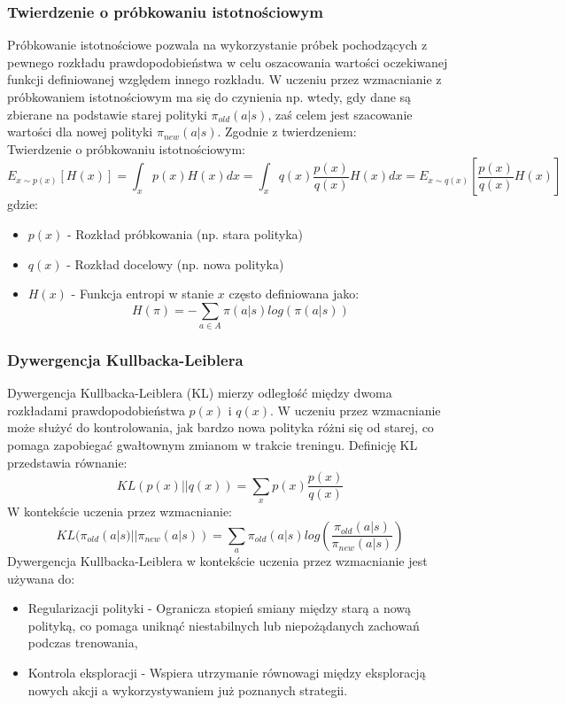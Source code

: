 \documentclass[a4paper, 12pt]{article}
\numberwithin{equation}{section}
\begin{document}
    \subsubsection{Twierdzenie o próbkowaniu istotnościowym}
    Próbkowanie istotnościowe pozwala na wykorzystanie próbek pochodzących z pewnego rozkładu prawdopodobieństwa w celu oszacowania wartości oczekiwanej funkcji definiowanej względem innego rozkładu. W uczeniu przez wzmacnianie z próbkowaniem istotnościowym ma się do czynienia np. wtedy, gdy dane są zbierane na podstawie starej polityki \( \pi_{old}(a|s) \), zaś celem jest szacowanie wartości dla nowej polityki \( \pi_{new} (a|s) \). Zgodnie z twierdzeniem:
    \\ Twierdzenie o próbkowaniu istotnościowym:
    \begin{equation}
    E_{x \sim p(x)} [H(x)] = \int_{x} p(x)H(x) dx = \int_{x} q(x) \frac{p(x)}{q(x)} H(x) dx = E_{x \sim q(x)} [\frac{p(x)}{q(x)}H(x)]
    \end{equation}
    gdzie:
    \begin{itemize}
        \item \( p(x) \) - Rozkład próbkowania (np. stara polityka)
        \item \( q(x) \) - Rozkład docelowy (np. nowa polityka)
        \item \( H(x) \) - Funkcja entropi w stanie \( x \) często definiowana jako:
        \begin{equation}
        H(\pi) = - \sum_{a \in A} \pi(a|s)log(\pi(a|s)) 
        \end{equation}
    \end{itemize}
    \subsubsection{Dywergencja Kullbacka-Leiblera}
    Dywergencja Kullbacka-Leiblera (KL) mierzy odległość między dwoma rozkładami prawdopodobieństwa \( p(x) \) i \( q(x) \). W uczeniu przez wzmacnianie może służyć do kontrolowania, jak bardzo nowa polityka różni się od starej, co pomaga zapobiegać gwałtownym zmianom w trakcie treningu. Definicję KL przedstawia równanie:
    \begin{equation}
    KL(p(x) || q(x)) = \sum_{x} p(x) \frac{p(x)}{q(x)}
    \end{equation}
    W kontekście uczenia przez wzmacnianie:
    \begin{equation}
    KL(\pi_{old}(a|s) || \pi_{new}(a|s)) = \sum_{a} \pi_{old}(a|s) log(\frac{\pi_{old}(a|s)}{\pi_{new}(a|s)})
    \end{equation}
    Dywergencja Kullbacka-Leiblera w kontekście uczenia przez wzmacnianie jest używana do:
    \begin{itemize}
        \item Regularizacji polityki - Ogranicza stopień smiany między starą a nową polityką, co pomaga uniknąć niestabilnych lub niepożądanych zachowań podczas trenowania,
        \item Kontrola eksploracji - Wspiera utrzymanie równowagi między eksploracją nowych akcji a wykorzystywaniem już poznanych strategii.
    \end{itemize}
\end{document}
